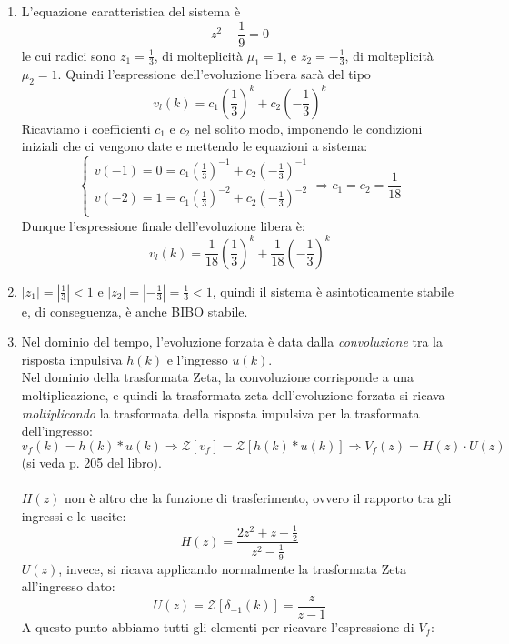 \documentclass[12pt,a4paper]{article}
\begin{document}
		\begin{enumerate}
			\item L'equazione caratteristica del sistema è
			\[
				z^2 - \frac{1}{9} = 0
			\]
			le cui radici sono $z_1 = \frac{1}{3}$, di molteplicit\`a $\mu_1 = 1$, e $z_2 = -\frac{1}{3}$, di molteplicit\`a $\mu_2 = 1$.
			Quindi l'espressione dell'evoluzione libera sar\`a del tipo
			\[
				v_l(k) = c_1\left(\frac{1}{3}\right)^k + c_2\left(-\frac{1}{3}\right)^k
			\]
			Ricaviamo i coefficienti $c_1$ e $c_2$ nel solito modo, imponendo le condizioni iniziali che ci vengono date e mettendo le equazioni a sistema:
			\[
				\begin{cases}
				v(-1) = 0 = c_1\left(\frac{1}{3}\right)^{-1} + c_2\left(-\frac{1}{3}\right)^{-1} \\
				v(-2) = 1 = c_1\left(\frac{1}{3}\right)^{-2} + c_2\left(-\frac{1}{3}\right)^{-2} \\
				\end{cases}
				\Rightarrow
				c_1 = c_2 = \frac{1}{18}
			\]
			Dunque l'espressione finale dell'evoluzione libera \`e:
			\[
				v_l(k) = \frac{1}{18}\left(\frac{1}{3}\right)^k + \frac{1}{18}\left(-\frac{1}{3}\right)^k
			\]
			\item $|z_1| = \left|\frac{1}{3}\right| < 1$ e $|z_2| = \left|-\frac{1}{3}\right| = \frac{1}{3} < 1 $, quindi il sistema \`e asintoticamente stabile e, di conseguenza, è anche BIBO stabile.
			\item Nel dominio del tempo, l'evoluzione forzata è data dalla \textit{convoluzione} tra la risposta impulsiva $h(k)$ e l'ingresso $u(k)$.\\Nel dominio della trasformata Zeta, la convoluzione corrisponde a una moltiplicazione, e quindi la trasformata zeta dell'evoluzione forzata si ricava \textit{moltiplicando} la trasformata della risposta impulsiva per la trasformata dell'ingresso:\\
			\[
				v_f(k) = h(k) * u(k)
				\Rightarrow
				\mathcal{Z}[v_f] = \mathcal{Z}[h(k) * u(k)]
				\Rightarrow
				V_f(z) = H(z) \cdot U(z)
			\]
			(si veda p. 205 del libro).\\ \\
			$H(z)$ non \`e altro che la funzione di trasferimento, ovvero il rapporto tra gli ingressi e le uscite:
			\[
				H(z) = \frac{2z^2 + z + \frac{1}{2}}{z^2 - \frac{1}{9}}
			\]
			$U(z)$, invece, si ricava applicando normalmente la trasformata Zeta all'ingresso dato:
			\[
				U(z) = \mathcal{Z}[\delta_{-1}(k)] = \frac{z}{z-1}
			\]
			A questo punto abbiamo tutti gli elementi per ricavare l'espressione di $V_f$:

\end{enumerate}
\end{document}
